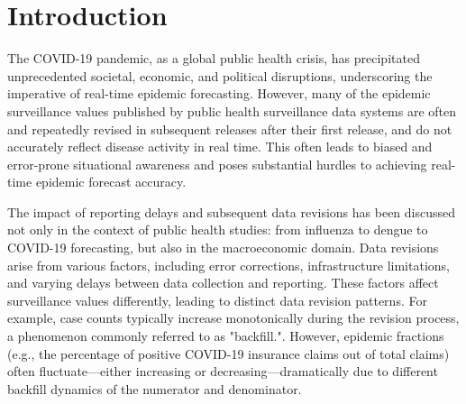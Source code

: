 \section{Introduction}

The COVID-19 pandemic, as a global public health crisis, has precipitated unprecedented societal, economic, and political disruptions, underscoring the imperative of real-time epidemic forecasting. However, many of the epidemic surveillance values published by public health surveillance data systems are often and repeatedly revised in subsequent releases after their first release, and do not accurately reflect disease activity in real time. This often leads to biased and error-prone situational awareness\cite{McGough2020}\cite{Rosenfeld2021} and poses substantial hurdles to achieving real-time epidemic forecast accuracy.

The impact of reporting delays and subsequent data revisions has been discussed not only in the context of public health studies: from influenza\cite{chakraborty2018know} to dengue \cite{rangarajan2019forecasting} to COVID-19 forecasting\cite{rodriguez2021deepcovid}\cite{adiga2020mathematical}, but also in the macroeconomic domain\cite{clements2019data}. Data revisions arise from various factors, including error corrections, infrastructure limitations, and varying delays between data collection and reporting\cite{reich2019collaborative}\cite{Chakraborty2018}. These factors affect surveillance values differently, leading to distinct data revision patterns. For example, case counts typically increase monotonically during the revision process, a phenomenon commonly referred to as "backfill.". However, epidemic fractions (e.g., the percentage of positive COVID-19 insurance claims out of total claims) often fluctuate—either increasing or decreasing—dramatically due to different backfill dynamics of the numerator and denominator.


